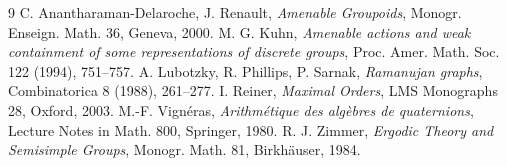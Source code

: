 \documentclass[11pt]{amsart}
\numberwithin{equation}{section}
\theoremstyle{definition}
\theoremstyle{remark}
\begin{document}
\begin{thebibliography}{9}
 C. Anantharaman-Delaroche, J. Renault, \emph{Amenable Groupoids}, Monogr. Enseign. Math. 36, Geneva, 2000.
 M. G. Kuhn, \emph{Amenable actions and weak containment of some representations of discrete groups}, Proc. Amer. Math. Soc. 122 (1994), 751--757.
 A. Lubotzky, R. Phillips, P. Sarnak, \emph{Ramanujan graphs}, Combinatorica 8 (1988), 261--277.
 I. Reiner, \emph{Maximal Orders}, LMS Monographs 28, Oxford, 2003.
 M.-F. Vign\'eras, \emph{Arithm\'etique des alg\`ebres de quaternions}, Lecture Notes in Math. 800, Springer, 1980.
 R. J. Zimmer, \emph{Ergodic Theory and Semisimple Groups}, Monogr. Math. 81, Birkh\"auser, 1984.
\end{thebibliography}
\end{document}
